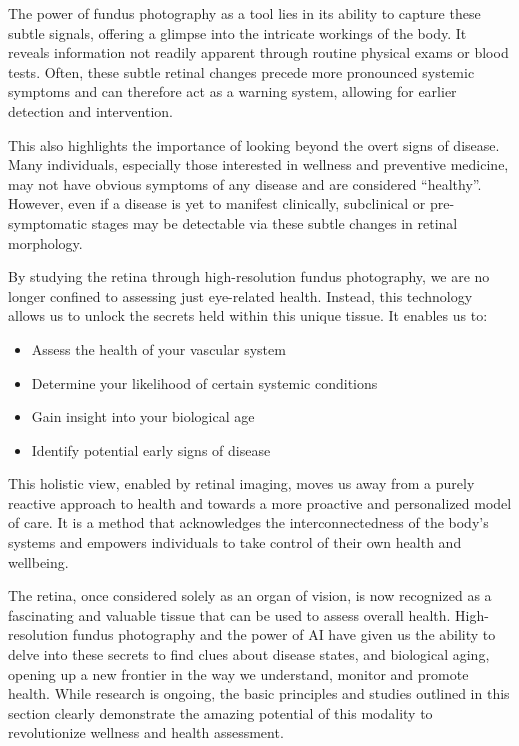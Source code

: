 \documentclass[
  Letterpaper,
]{scrbook}
\begin{document}
The power of fundus photography as a tool lies in its ability to capture
these subtle signals, offering a glimpse into the intricate workings of
the body. It reveals information not readily apparent through routine
physical exams or blood tests. Often, these subtle retinal changes
precede more pronounced systemic symptoms and can therefore act as a
warning system, allowing for earlier detection and intervention.

This also highlights the importance of looking beyond the overt signs of
disease. Many individuals, especially those interested in wellness and
preventive medicine, may not have obvious symptoms of any disease and
are considered ``healthy''. However, even if a disease is yet to
manifest clinically, subclinical or pre-symptomatic stages may be
detectable via these subtle changes in retinal morphology.

By studying the retina through high-resolution fundus photography, we
are no longer confined to assessing just eye-related health. Instead,
this technology allows us to unlock the secrets held within this unique
tissue. It enables us to:

\begin{itemize}
\item
  Assess the health of your vascular system
\item
  Determine your likelihood of certain systemic conditions
\item
  Gain insight into your biological age
\item
  Identify potential early signs of disease
\end{itemize}

This holistic view, enabled by retinal imaging, moves us away from a
purely reactive approach to health and towards a more proactive and
personalized model of care. It is a method that acknowledges the
interconnectedness of the body's systems and empowers individuals to
take control of their own health and wellbeing.

The retina, once considered solely as an organ of vision, is now
recognized as a fascinating and valuable tissue that can be used to
assess overall health. High-resolution fundus photography and the power
of AI have given us the ability to delve into these secrets to find
clues about disease states, and biological aging, opening up a new
frontier in the way we understand, monitor and promote health. While
research is ongoing, the basic principles and studies outlined in this
section clearly demonstrate the amazing potential of this modality to
revolutionize wellness and health assessment.
\end{document}
